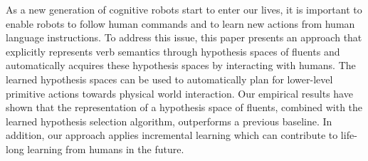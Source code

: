 As a new generation of cognitive robots start to enter our lives, it is important to enable robots to follow human commands and to learn new actions from human language instructions. To address this issue, this paper presents an approach that explicitly represents verb semantics through hypothesis spaces of fluents and automatically acquires these hypothesis spaces by interacting with humans. The learned hypothesis spaces can be used to automatically plan for lower-level primitive actions towards physical world interaction. Our empirical results have shown that the representation of a hypothesis space of fluents, combined with the learned hypothesis selection algorithm, outperforms a previous baseline. In addition, our approach applies incremental learning which can contribute to life-long learning from humans in the future.
